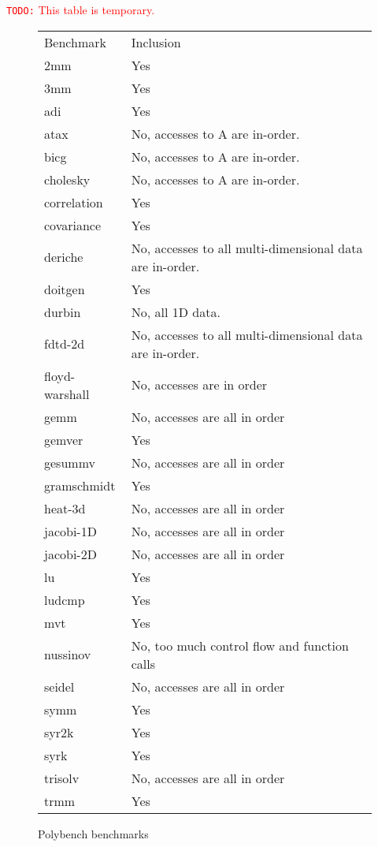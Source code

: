 \documentclass[sigconf, table]{acmart}
\newcommand{\todo}[1]{{\textcolor{red}{{\tt{TODO:}}\,\,#1 }}}
\begin{document}
\todo{This table is temporary.}
\begin{figure*}
\begin{tabular}{ll}
Benchmark   & Inclusion \\
2mm         & Yes          \\
3mm         & Yes          \\
adi         & Yes          \\
atax        & No, accesses to A are in-order.          \\
bicg        & No, accesses to A are in-order.          \\
cholesky    & No, accesses to A are in-order.          \\
correlation & Yes          \\
covariance  & Yes          \\
deriche     & No, accesses to all multi-dimensional data are in-order.          \\
doitgen     & Yes          \\
durbin      & No, all 1D data.          \\
fdtd-2d     & No, accesses to all multi-dimensional data are in-order.           \\
floyd-warshall & No, accesses are in order \\
gemm        &  No, accesses are all in order         \\
gemver      & Yes          \\
gesummv     & No, accesses are all in order          \\
gramschmidt & Yes          \\
heat-3d     & No, accesses are all in order            \\
jacobi-1D   & No, accesses are all in order           \\
jacobi-2D   & No, accesses are all in order           \\
lu          & Yes         \\
ludcmp      & Yes          \\
mvt         & Yes          \\
nussinov    & No, too much control flow and function calls          \\
seidel      & No, accesses are all in order           \\
symm        & Yes          \\
syr2k       & Yes          \\
syrk        & Yes          \\
trisolv     & No, accesses are all in order           \\
trmm        & Yes         
\end{tabular}
\caption{Polybench benchmarks}
\end{figure*}
\end{document}
